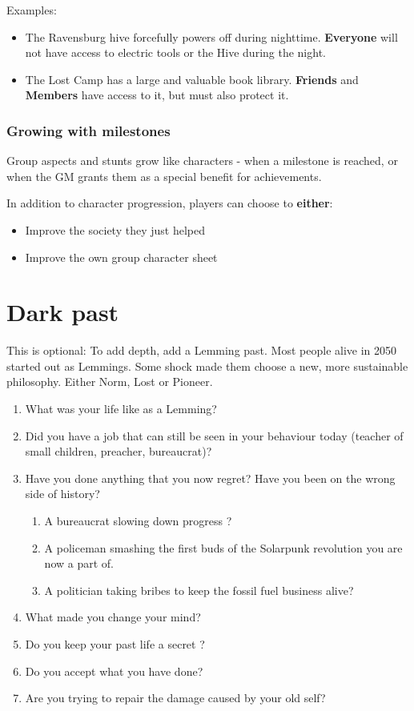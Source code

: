 Examples:
\begin{itemize}
    \item The Ravensburg hive forcefully powers off during nighttime. \textbf{Everyone} will not have access to electric tools or the Hive during the night.
    \item The Lost Camp has a large and valuable book library. \textbf{Friends} and \textbf{Members} have access to it, but must also protect it.
\end{itemize}

\subsubsection{Growing with milestones}

Group aspects and stunts grow like characters - when a milestone is reached, or when the GM grants them as a special benefit for achievements.

In addition to character progression, players can choose to \textbf{either}:

\begin{itemize}
    \item Improve the society they just helped
    \item Improve the own group character sheet
\end{itemize}


\section{Dark past}

This is optional: To add depth, add a Lemming past. Most people alive in 2050 started out as Lemmings. Some shock made them choose a new, more sustainable philosophy. Either Norm, Lost or Pioneer.

\begin{enumerate}
    \item What was your life like as a Lemming?
    \item Did you have a job that can still be seen in your behaviour today (teacher of small children, preacher, bureaucrat)?
    \item Have you done anything that you now regret? Have you been on the wrong side of history?
    \begin{enumerate}
        \item A bureaucrat slowing down progress ?
        \item A policeman smashing the first buds of the Solarpunk revolution you are now a part of.
        \item A politician taking bribes to keep the fossil fuel business alive?
    \end{enumerate}
    \item What made you change your mind?
    \item Do you keep your past life a secret ?
    \item Do you accept what you have done?
    \item Are you trying to repair the damage caused by your old self?
\end{enumerate}

